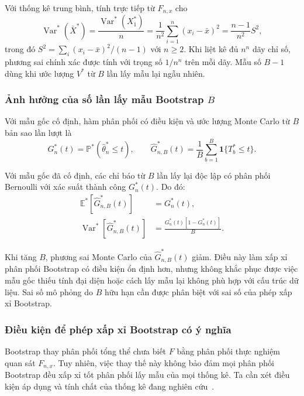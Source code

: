 \documentclass[12pt,a4paper]{article}
\theoremstyle{definition}
\numberwithin{equation}{section}
\begin{document}
    Với thống kê trung bình, tính trực tiếp từ $F_{n,x}$ cho
    \begin{equation}
        \operatorname{Var}^*(\bar X^*)
        =\frac{\operatorname{Var}^*(X_1^*)}{n}
        =\frac1{n^2}\sum_{i=1}^n(x_i-\bar x)^2
        =\frac{n-1}{n^2}S^2,
        \label{eq:bootstrap-mean-variance}
    \end{equation}
    trong đó $S^2=\sum_i(x_i-\bar x)^2/(n-1)$ với $n\ge2$.
    Khi liệt kê đủ $n^n$ dãy chỉ số, phương sai chính xác được tính với
    trọng số $1/n^n$ trên mỗi dãy. Mẫu số $B-1$ dùng khi ước lượng $V^*$
    từ $B$ lần lấy mẫu lại ngẫu nhiên.

    \subsubsection{Ảnh hưởng của số lần lấy mẫu Bootstrap $B$}

    Với mẫu gốc cố định, hàm phân phối có điều kiện và ước lượng Monte Carlo
    từ $B$ bản sao lần lượt là
    \[
        G_n^*(t)=\mathbb P^*(\hat\theta_n^*\le t),
        \qquad
        \widehat G_{n,B}^*(t)=\frac1B\sum_{b=1}^B\mathbf{1}\{T_b^*\le t\}.
    \]

	Với mẫu gốc đã cố định, các chỉ báo từ $B$ lần lấy lại độc lập có phân phối Bernoulli
	với xác suất thành công $G_n^*(t)$. Do đó:
	\begin{align}
		\mathbb{E}^*\left[\widehat{G}_{n,B}^*(t)\right]
		&=G_n^*(t),\\
		\operatorname{Var}^*\left[\widehat{G}_{n,B}^*(t)\right]
		&=\frac{G_n^*(t)\left[1-G_n^*(t)\right]}{B}.
	\end{align}

	Khi tăng $B$, phương sai Monte Carlo của $\widehat{G}_{n,B}^*(t)$ giảm.
	Điều này làm xấp xỉ phân phối Bootstrap có điều kiện ổn định hơn, nhưng
	không khắc phục được việc mẫu gốc thiếu tính đại diện hoặc cách lấy mẫu
	lại không phù hợp với cấu trúc dữ liệu. Sai số mô phỏng do $B$ hữu hạn
	cần được phân biệt với sai số của phép xấp xỉ Bootstrap.

\subsubsection{Điều kiện để phép xấp xỉ Bootstrap có ý nghĩa}

Bootstrap thay phân phối tổng thể chưa biết $F$ bằng phân phối thực
nghiệm quan sát $F_{n,x}$. Tuy nhiên, việc thay thế này không bảo đảm mọi phân phối
Bootstrap đều xấp xỉ tốt phân phối lấy mẫu của mọi thống kê. Ta cần xét
điều kiện áp dụng và tính chất của thống kê đang nghiên cứu~\cite[Theorem 2.1, tr. 1198]{bickelfreedman1981}.
\end{document}
